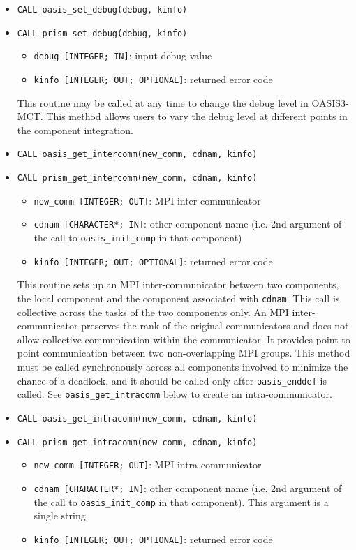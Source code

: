 \begin{itemize}
  \vspace{0.2cm}
\item {\tt CALL oasis\_set\_debug(debug, kinfo)}
\item {\tt CALL prism\_set\_debug(debug, kinfo)}
  \begin{itemize}
  \item {\tt debug [INTEGER; IN]}: input debug value
  \item {\tt kinfo [INTEGER; OUT; OPTIONAL]}: returned error code
  \end{itemize}

  This routine may be called at any time to change the debug level in
  OASIS3-MCT.  This method allows users to vary the debug level at
  different points in the component integration.

  \vspace{0.2cm}
\item {\tt CALL oasis\_get\_intercomm(new\_comm, cdnam, kinfo)}
\item {\tt CALL prism\_get\_intercomm(new\_comm, cdnam, kinfo)}
  \begin{itemize}
  \item {\tt new\_comm [INTEGER; OUT]}: MPI inter-communicator
  \item {\tt cdnam [CHARACTER*; IN]}: other component name (i.e. 2nd argument of  the call to {\tt oasis\_init\_comp} in that component)
  \item {\tt kinfo [INTEGER; OUT; OPTIONAL]}: returned error code
  \end{itemize}

  This routine sets up an MPI inter-communicator between two components,
  the local component and the component
  associated with {\tt cdnam}.  This call is collective across the
  tasks of the two components only.
  An MPI inter-communicator preserves the rank of the original communicators
  and does not allow collective communication within the communicator.  It
  provides point to point communication between two non-overlapping MPI groups.
  This method must be called synchronously across all components involved to
  minimize the chance of a deadlock, and it should be called only after
  {\tt oasis\_enddef} is called.
  See {\tt oasis\_get\_intracomm} below to create an intra-communicator.

  \vspace{0.2cm}
\item {\tt CALL oasis\_get\_intracomm(new\_comm, cdnam, kinfo)}
\item {\tt CALL prism\_get\_intracomm(new\_comm, cdnam, kinfo)}
  \begin{itemize}
  \item {\tt new\_comm [INTEGER; OUT]}: MPI intra-communicator
  \item {\tt cdnam [CHARACTER*; IN]}: other component name (i.e. 2nd argument of the call to {\tt oasis\_init\_comp} in that component).  This argument is a single string.
  \item {\tt kinfo [INTEGER; OUT; OPTIONAL]}: returned error code
  \end{itemize}


\end{itemize}
